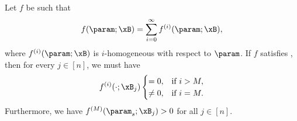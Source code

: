\begin{lemma}
\label{lem: Sanity check for gradient flow}
Let $f$ be such that
\[
    f(\param; \xB) = \sum_{i=0}^\infty f^{(i)}(\param;\xB),
\]
where $f^{(i)}(\param;\xB)$ is $i$-homogeneous with respect to $\param$. 
If $f$ satisfies , 
then for every $j\in[n]$, we must have 
\begin{align*}
    f^{(i)}(\cdot;\xB_j) \begin{cases}
        = 0, & \text{if } i>M, \\
        \ne 0, & \text{if } i=M.
    \end{cases}
\end{align*}
Furthermore, we have $f^{(M)}(\param_s; \xB_j) >0$ for all $j\in [n]$. 
\end{lemma}


